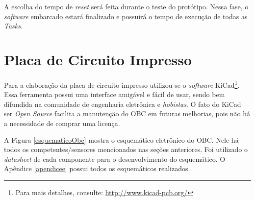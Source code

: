 A escolha do tempo de \textit{reset} será feita durante o teste do protótipo. Nessa fase, o \textit{software} embarcado estará finalizado e possuirá o tempo de execução de todas as \textit{Tasks}.

\newpage

\section{Placa de Circuito Impresso}

Para a elaboração da placa de circuito impresso utilizou-se o \textit{software} KiCad\footnote{Para mais detalhes, consulte:  \url{http://www.kicad-pcb.org/}}. Essa ferramenta possui uma interface amigável e fácil de usar, sendo bem difundida na comunidade de engenharia eletrônica e \textit{hobistas}. O fato do KiCad ser \textit{Open Source} facilita a manutenção do OBC em futuras melhorias, pois não há a necessidade de comprar uma licença.

A Figura \ref{esquematicoObc} mostra o esquemático eletrônico do OBC. Nele há todos os competentes/sensores mencionados nas seções anteriores. Foi utilizado o \textit{datasheet} de cada componente para o desenvolvimento do esquemático. O Apêndice \ref{apendicee} possui todos os esquemáticos realizados.

